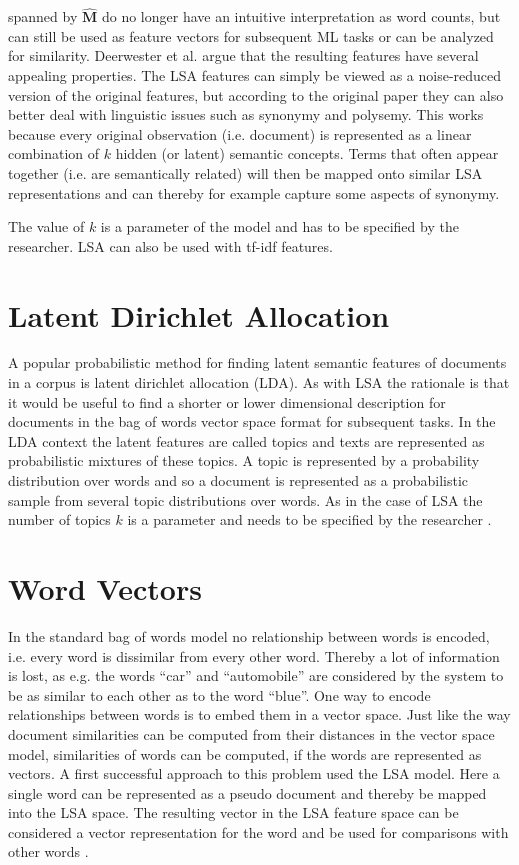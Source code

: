 \documentclass[Thesis.tex]{subfiles}
\begin{document}
spanned by $\hat{\textbf{M}}$ do no longer have an intuitive interpretation
as word counts, but can still be used as feature vectors for subsequent
ML tasks or can be analyzed for similarity. Deerwester et al. argue
that the resulting features have several appealing properties. The
LSA features can simply be viewed as a noise-reduced version of the
original features, but according to the original paper they can also
better deal with linguistic issues such as synonymy and polysemy.
This works because every original observation (i.e. document) is represented
as a linear combination of $k$ hidden (or latent) semantic concepts.
Terms that often appear together (i.e. are semantically related) will
then be mapped onto similar LSA representations and can thereby for
example capture some aspects of synonymy.

The value of $k$ is a parameter of the model and has to be specified
by the researcher. LSA can also be used with tf-idf features.


\section{Latent Dirichlet Allocation}

A popular probabilistic method for finding latent semantic features
of documents in a corpus is latent dirichlet allocation (LDA). As
with LSA the rationale is that it would be useful to find a shorter
or lower dimensional description for documents in the bag of words
vector space format for subsequent tasks. In the LDA context the latent
features are called topics and texts are represented as probabilistic
mixtures of these topics. A topic is represented by a probability
distribution over words and so a document is represented as a probabilistic
sample from several topic distributions over words. As in the case of LSA the
number of topics $k$ is a parameter and needs to be specified by
the researcher \citep{Blei2003}. 


\section{Word Vectors}

In the standard bag of words model no relationship between words is
encoded, i.e. every word is dissimilar from every other word. Thereby
a lot of information is lost, as e.g. the words ``car'' and ``automobile''
are considered by the system to be as similar to each other as to
the word ``blue''. One way to encode relationships between words
is to embed them in a vector space. Just like the way document similarities
can be computed from their distances in the vector space model, similarities
of words can be computed, if the words are represented as vectors.
A first successful approach to this problem used the LSA model. Here
a single word can be represented as a pseudo document and thereby
be mapped into the LSA space. The resulting vector in the LSA feature
space can be considered a vector representation for the word and be
used for comparisons with other words \citep{Deerwester1990}.
\end{document}
